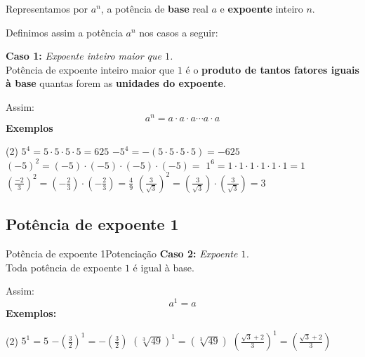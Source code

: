 \documentclass[aspectratio=169,11pt]{uu-beamer}
\begin{document}
    \begin{frame}
        \begin{definicao}
           Representamos por \(a^n\), a potência de \textbf{base} real \(a\) e \textbf{expoente} inteiro \(n\).
        \end{definicao}
           Definimos assim a potência \(a^n\) nos casos a seguir:
        
        \vspace{.3cm}
            \textbf{Caso 1:} \textit{Expoente inteiro maior que \(1\).}
            \vspace{.1cm} 
            \\
                Potência de expoente inteiro maior que \(1\) é o \textbf{produto de tantos fatores iguais à base} quantas forem as \textbf{unidades do expoente}.
                
                Assim:
                        \[ a^n = a \cdot a \cdot a \cdots a \cdot a\]
\pause     
                \textbf{Exemplos}
                    \begin{tasks}(2)
                    \task \( 5^4 = 5 \cdot 5 \cdot 5 \cdot 5 = 625 \)
                    \task \( -5^4 = -(5 \cdot 5 \cdot 5 \cdot 5) = -625 \)
                    \task \( (-5)^2 = (-5) \cdot (-5) \cdot (-5) \cdot (-5)=\)
                    \task \( 1^6 = 1 \cdot 1 \cdot 1 \cdot 1 \cdot 1 \cdot 1 = 1\)
                    \task \( \left( \frac{-2}{3} \right)^2 = \left( -\frac{2}{3} \right) \cdot \left( -\frac{2}{3} \right) = \frac{4}{9}\)
                    \task \( \left( \frac{3}{\sqrt{3}} \right)^2 = \left( \frac{3}{\sqrt{3}} \right) \cdot \left( \frac{3}{\sqrt{3}} \right) = 3 \)
                \end{tasks}
    \end{frame}
    \subsection{Potência de expoente 1}
    \begin{frame}{Potência de expoente 1}{Potenciação}
        \textbf{Caso 2:} \textit{Expoente \(1\).}
            \vspace{.1cm} 
            \\
            Toda potência de expoente \(1\) é igual à base.
            
            Assim:
                \[ a^1 = a \]
            \textbf{Exemplos:}
                \begin{tasks}(2)
                    \task \(5^1 = 5\)
                    \task \( - \left( \frac{3}{2} \right)^1 = - \left( \frac{3}{2} \right)\)
                    \task \(\left( \sqrt[3]{49} \right)^1 = \left( \sqrt[3]{49} \right)\)
                    \task \(\left( \frac{\sqrt{3} + 2}{3} \right)^1 = \left( \frac{\sqrt{3} + 2}{3} \right)\)
                \end{tasks}
    \end{frame}
\end{document}
